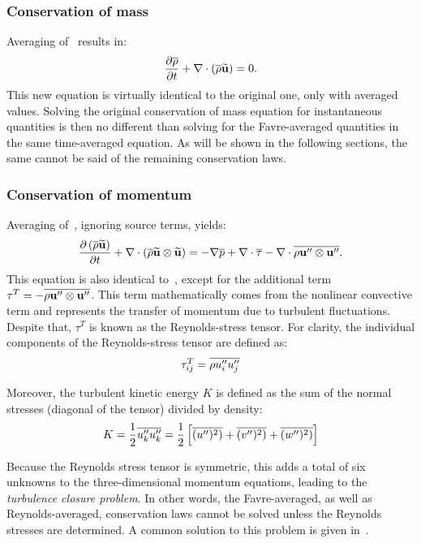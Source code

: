 \subsubsection{Conservation of mass}
%
Averaging of~ results in:
\begin{equation}
     \frac{\partial \overline{\rho}}{\partial t} 
        + \nabla\cdot \left(
            \overline{\rho}\widetilde{\mathbf{u}}
        \right) = 0
    \label{eq:rmass}.
\end{equation}
This new equation is virtually identical to the original one, only with averaged values. Solving the original conservation of mass equation for instantaneous quantities is then no different than solving for the Favre-averaged quantities in the same time-averaged equation. As will be shown in the following sections, the same cannot be said of the remaining conservation laws.
%
\subsubsection{Conservation of momentum}
%
Averaging of~, ignoring source terms, yields:
\begin{equation}
     \frac{\partial \left(\overline{\rho}\widetilde{\mathbf{u}}\right)}{\partial t} 
        + \nabla\cdot \left(
            \overline{\rho}\widetilde{\mathbf{u}}\otimes\widetilde{\mathbf{u}}
        \right) =
        - \nabla\overline{p}
        + \nabla\cdot\overline{\tau}
        - \nabla\cdot
            \overline{\rho \mathbf{u}''\otimes\mathbf{u}''}
    \label{eq:rmom}.
\end{equation}
This equation is also identical to~, except for the additional term $\tau^T =  -\overline{\rho \mathbf{u}''\otimes\mathbf{u}''}$. This term mathematically comes from the nonlinear convective term and represents the transfer of momentum due to turbulent fluctuations. Despite that, $\tau^T$ is known as the Reynolds-stress tensor. For clarity, the individual components of the Reynolds-stress tensor are defined as:
\begin{equation*}
    \tau^T_{ij} = \overline{\rho u_i''u_j''}
\end{equation*}

Moreover, the turbulent kinetic energy $K$ is defined as the sum of the normal stresses (diagonal of the tensor) divided by density:
\begin{equation*}
    K = \frac{1}{2}\overline{u_k''u_k''} = \frac{1}{2}\left[
        \overline{(u'')^2)} + \overline{(v'')^2)} + \overline{(w'')^2)}
    \right]
\end{equation*}

Because the Reynolds stress tensor is symmetric, this adds a total of six unknowns to the three-dimensional momentum equations, leading to the \textit{turbulence closure problem}. In other words, the Favre-averaged, as well as Reynolds-averaged, conservation laws cannot be solved unless the Reynolds stresses are determined. A common solution to this problem is given in~.
%
